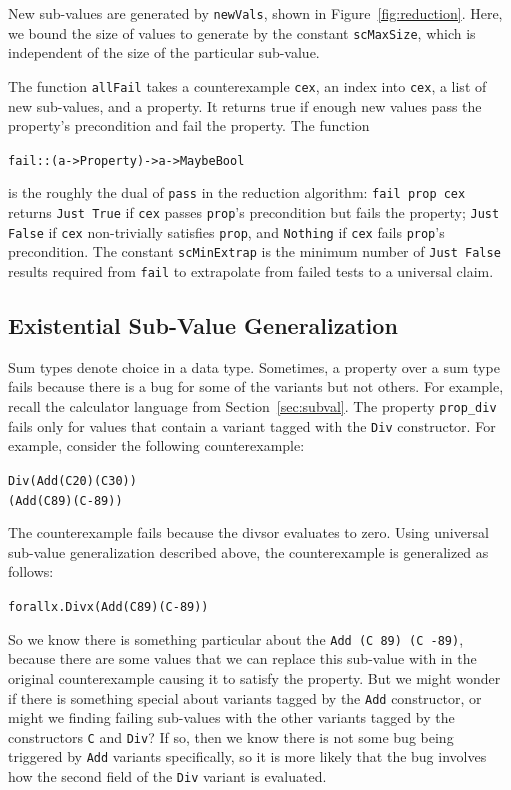 \documentclass[10pt]{sigplanconf}
\newenvironment{code}{\begin{alltt}}{\end{alltt}}
\newcommand{\ttp}[1]{\texttt{#1}}
\begin{document}
New sub-values are generated by \ttp{newVals}, shown in
Figure~\ref{fig:reduction}.  Here, we bound the size of values to generate by
the constant \ttp{scMaxSize}, which is independent of the size of the particular
sub-value.

The function \ttp{allFail} takes a counterexample \ttp{cex}, an index into
\ttp{cex}, a list of new sub-values, and a property.  It returns true if enough
new values pass the property's precondition and fail the property.  The function
%
\begin{code}
fail :: (a -> Property) -> a -> Maybe Bool
\end{code}
%
\noindent
is the roughly the dual of \ttp{pass} in the reduction algorithm: \ttp{fail prop
  cex} returns \ttp{Just True} if \ttp{cex} passes \ttp{prop}'s precondition but
fails the property; \ttp{Just False} if \ttp{cex} non-trivially satisfies
\ttp{prop}, and \ttp{Nothing} if \ttp{cex} fails \ttp{prop}'s precondition.  The
constant \ttp{scMinExtrap} is the minimum number of \ttp{Just False} results
required from \ttp{fail} to extrapolate from failed tests to a universal claim.


\subsection{Existential Sub-Value Generalization}

Sum types denote choice in a data type.  Sometimes, a property over a sum type
fails because there is a bug for some of the variants but not others.  For
example, recall the calculator language from Section~\ref{sec:subval}.  The
property \ttp{prop\_div} fails only for values that contain a variant tagged
with the \ttp{Div} constructor.  For example, consider the following counterexample:
%
\begin{code}
Div (Add (C 20) (C 30))
    (Add (C 89) (C -89))
\end{code}
%
\noindent
The counterexample fails because the divsor evaluates to zero.  Using universal
sub-value generalization described above, the counterexample is generalized as
follows:
%
\begin{code}
forall x . Div x (Add (C 89) (C -89))
\end{code}
%
\noindent
So we know there is something particular about the \ttp{Add (C 89) (C -89)},
because there are some values that we can replace this sub-value with in the
original counterexample causing it to satisfy the property.  But we might wonder
if there is something special about variants tagged by the \ttp{Add}
constructor, or might we finding failing sub-values with the other variants
tagged by the constructors \ttp{C} and \ttp{Div}?  If so, then we know there is
not some bug being triggered by \ttp{Add} variants specifically, so it is more
likely that the bug involves how the second field of the \ttp{Div} variant is
evaluated.
\end{document}
